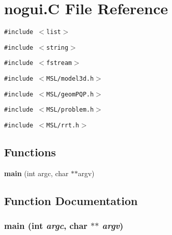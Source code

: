 \section{nogui.C File Reference}
\label{nogui_8C}
{\tt \#include $<$list$>$}\par
{\tt \#include $<$string$>$}\par
{\tt \#include $<$fstream$>$}\par
{\tt \#include $<$MSL/model3d.h$>$}\par
{\tt \#include $<$MSL/geom\-PQP.h$>$}\par
{\tt \#include $<$MSL/problem.h$>$}\par
{\tt \#include $<$MSL/rrt.h$>$}\par
\subsection*{Functions}
\begin{CompactItemize}
\item 
{\bf main} (int argc, char $\ast$$\ast$argv)
\end{CompactItemize}


\subsection{Function Documentation}
\subsubsection{\setlength{\rightskip}{0pt plus 5cm}main (int {\em argc}, char $\ast$$\ast$ {\em argv})}\label{nogui_8C_a0}


